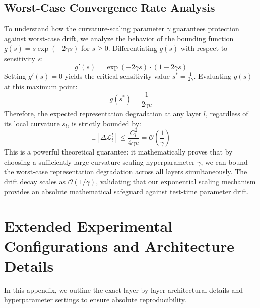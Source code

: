 \documentclass{article}
\begin{document}
\subsection{Worst-Case Convergence Rate Analysis}
To understand how the curvature-scaling parameter $\gamma$ guarantees protection against worst-case drift, we analyze the behavior of the bounding function $g(s) = s \exp(-2 \gamma s)$ for $s \ge 0$. Differentiating $g(s)$ with respect to sensitivity $s$:
\begin{equation}
    g'(s) = \exp(-2 \gamma s) \cdot (1 - 2 \gamma s)
\end{equation}
Setting $g'(s) = 0$ yields the critical sensitivity value $s^* = \frac{1}{2\gamma}$. Evaluating $g(s)$ at this maximum point:
\begin{equation}
    g(s^*) = \frac{1}{2\gamma e}
\end{equation}
Therefore, the expected representation degradation at any layer $l$, regardless of its local curvature $s_l$, is strictly bounded by:
\begin{equation}
    \mathbb{E}[\Delta \mathcal{L}_t^l] \le \frac{C_l^2}{4 \gamma e} = \mathcal{O}\left( \frac{1}{\gamma} \right)
\end{equation}
This is a powerful theoretical guarantee: it mathematically proves that by choosing a sufficiently large curvature-scaling hyperparameter $\gamma$, we can bound the worst-case representation degradation across all layers simultaneously. The drift decay scales as $\mathcal{O}(1/\gamma)$, validating that our exponential scaling mechanism provides an absolute mathematical safeguard against test-time parameter drift.

\section{Extended Experimental Configurations and Architecture Details}
\label{app:configs}
In this appendix, we outline the exact layer-by-layer architectural details and hyperparameter settings to ensure absolute reproducibility.
\end{document}
